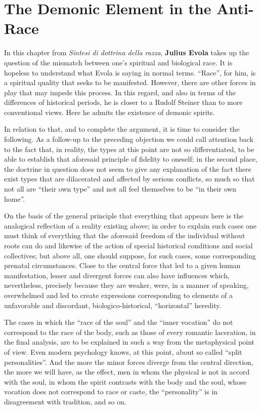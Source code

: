 \section{The Demonic Element in the Anti-Race}

\begin{quotex}
In this chapter from \emph{Sintesi di dottrina della razza}, \textbf{Julius Evola} takes up the question of the mismatch between one's spiritual and biological race. It is hopeless to understand what Evola is saying in normal terms. ``Race'', for him, is a spiritual quality that seeks to be manifested. However, there are other forces in play that may impede this process. In this regard, and also in terms of the differences of historical periods, he is closer to a Rudolf Steiner than to more conventional views. Here he admits the existence of demonic spirits.
\end{quotex}


In relation to that, and to complete the argument, it is time to consider the following. As a follow-up to the preceding objection we could call attention back to the fact that, in reality, the types at this point are not so differentiated, to be able to establish that aforesaid principle of fidelity to oneself; in the second place, the doctrine in question does not seem to give any explanation of the fact there exist types that are dilacerated and affected by serious conflicts, so much so that not all are ``their own type'' and not all feel themselves to be ``in their own home''.

On the basis of the general principle that everything that appears here is the analogical reflection of a reality existing above; in order to explain such cases one must think of everything that the aforesaid freedom of the individual without roots can do and likewise of the action of special historical conditions and social collectives; but above all, one should suppose, for such cases, some corresponding prenatal circumstances. Close to the central force that led to a given human manifestation, lesser and divergent forces can also have influences which, nevertheless, precisely because they are weaker, were, in a manner of speaking, overwhelmed and led to create expressions corresponding to elements of a unfavorable and discordant, biologico-historical, ``horizontal'' heredity.

The cases in which the ``race of the soul'' and the ``inner vocation'' do not correspond to the race of the body, such as those of every romantic laceration, in the final analysis, are to be explained in such a way from the metaphysical point of view. Even modern psychology knows, at this point, about so called ``split personalities''. And the more the minor forces diverge from the central direction, the more we will have, as the effect, men in whom the physical is not in accord with the soul, in whom the spirit contrasts with the body and the soul, whose vocation does not correspond to race or caste, the ``personality'' is in disagreement with tradition, and so on.

